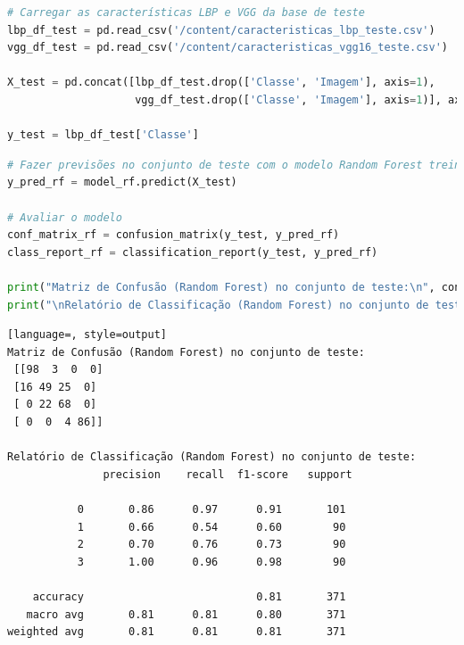 \begin{lstlisting}[language=Python, style=input]
# Carregar as características LBP e VGG da base de teste
lbp_df_test = pd.read_csv('/content/caracteristicas_lbp_teste.csv')
vgg_df_test = pd.read_csv('/content/caracteristicas_vgg16_teste.csv')

X_test = pd.concat([lbp_df_test.drop(['Classe', 'Imagem'], axis=1),
                    vgg_df_test.drop(['Classe', 'Imagem'], axis=1)], axis=1)

y_test = lbp_df_test['Classe']
\end{lstlisting}

\begin{lstlisting}[language=Python, style=input]
# Fazer previsões no conjunto de teste com o modelo Random Forest treinado
y_pred_rf = model_rf.predict(X_test)

# Avaliar o modelo
conf_matrix_rf = confusion_matrix(y_test, y_pred_rf)
class_report_rf = classification_report(y_test, y_pred_rf)

print("Matriz de Confusão (Random Forest) no conjunto de teste:\n", conf_matrix_rf)
print("\nRelatório de Classificação (Random Forest) no conjunto de teste:\n", class_report_rf)
\end{lstlisting}
\begin{lstlisting}[language=, style=output]
Matriz de Confusão (Random Forest) no conjunto de teste:
 [[98  3  0  0]
 [16 49 25  0]
 [ 0 22 68  0]
 [ 0  0  4 86]]

Relatório de Classificação (Random Forest) no conjunto de teste:
               precision    recall  f1-score   support

           0       0.86      0.97      0.91       101
           1       0.66      0.54      0.60        90
           2       0.70      0.76      0.73        90
           3       1.00      0.96      0.98        90

    accuracy                           0.81       371
   macro avg       0.81      0.81      0.80       371
weighted avg       0.81      0.81      0.81       371
\end{lstlisting}

